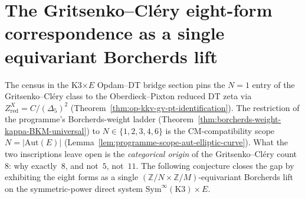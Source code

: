 \section{The Gritsenko--Cl\'ery eight-form correspondence as a single equivariant Borcherds lift}
\label{sec:gc-eight-form-equivariant-lift}

The census in the K3$\times E$ Opdam--DT bridge section pins the $N=1$ entry of the
Gritsenko--Cl\'ery class to the Oberdieck--Pixton reduced DT zeta via
$Z^X_{\mathrm{red}} = C/(\Delta_5)^2$
(Theorem~\ref{thm:op-kkv-gv-pt-identification}). The restriction of
the programme's Borcherds-weight ladder
(Theorem~\ref{thm:borcherds-weight-kappa-BKM-universal}) to
$N \in \{1,2,3,4,6\}$ is the CM-compatibility scope
$N = |\mathrm{Aut}(E)|$
(Lemma~\ref{lem:programme-scope-aut-elliptic-curve}). What the two
inscriptions leave open is the \emph{categorical origin} of the
Gritsenko--Cl\'ery count~$8$: why exactly~$8$, and not~$5$, not~$11$.
The following conjecture closes the gap by exhibiting the eight forms
as a single $(\mathbb{Z}/N \times \mathbb{Z}/M)$-equivariant Borcherds
lift on the symmetric-power direct system
$\mathrm{Sym}^\infty(\mathrm{K3}) \times E$.

